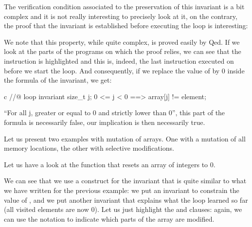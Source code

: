 The verification condition associated to the preservation of this invariant is
a bit complex and it is not really interesting to precisely look at it,
on the contrary, the proof that the invariant is established before
executing the loop is interesting:





We note that this property, while quite complex, is proved easily
by Qed. If we look at the parts of the programs on which the proof
relies, we can see that the instruction  is highlighted
and this is, indeed, the last instruction executed on  before
we start the loop. And consequently, if we replace the value of
 by 0 inside the formula of the invariant, we get:



\begin{CodeBlock}{c}
//@ loop invariant \forall size_t j; 0 <= j < 0 ==> array[j] != element;
\end{CodeBlock}



``For all j, greater or equal to 0 and strictly lower than 0'', this
part of the formula is necessarily false, our implication is then
necessarily true.





Let us present two examples with mutation of arrays. One with a mutation
of all memory locations, the other with selective modifications.





Let us have a look at the function that resets an array of integers to 0.






We can see that we use a construct for the invariant that is quite similar
to what we have written for the previous example: we put an invariant to
constrain the value of , and we put another invariant that
explains what the loop learned so far (all visited elements are now
$0$). Let us just highlight the  and
 clauses: again, we can use the notation
 to indicate which parts of the array are modified.



